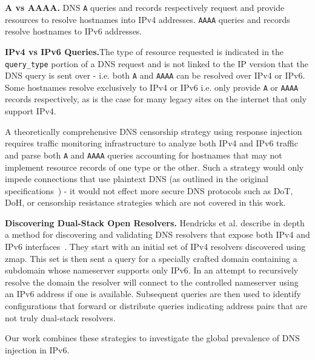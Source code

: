 \textbf{A vs AAAA.} DNS \texttt{A} queries and records respectively request and provide
resources to resolve hostnames into IPv4 addresses. \texttt{AAAA} queries and
records resolve hostnames to IPv6 addresses.

\textbf{IPv4 vs IPv6 Queries.}The type of resource requested is
indicated in the \texttt{query\_type} portion of a DNS request and is not linked
to the IP version that the DNS query is sent over - i.e. both \texttt{A} and
\texttt{AAAA} can be resolved over IPv4 or IPv6.
Some hostnames resolve exclusively to IPv4 or IPv6 i.e. only provide \texttt{A}
or \texttt{AAAA} records respectively, as is the case for many legacy sites on
the internet that only support IPv4.

A theoretically comprehensive DNS censorship strategy using response injection
requires traffic monitoring infrastructure to analyze both IPv4 and IPv6
traffic and parse both \texttt{A} and \texttt{AAAA} queries accounting for hostnames
that may not implement resource records of one type or the other. Such a strategy
would only impede connections that use plaintext DNS (as outlined in the
original specifications~\cite{RFC1035,RFC3596}) - it would not effect more secure DNS
protocols such as DoT, DoH, or censorship resistance strategies which are not
covered in this work.

\textbf{Discovering Dual-Stack Open Resolvers.}
Hendricks et al. describe in depth a method for discovering and validating DNS
resolvers that expose both IPv4 and IPv6 interfaces~\cite{hendriks2017potential}.
They start with an initial
set of IPv4 resolvers discovered using zmap. This set is then sent a query for a
specially crafted domain containing a subdomain whose nameserver supports only
IPv6. In an attempt to recursively resolve the domain the resolver will connect
to the controlled nameserver using an IPv6 address if one is available.
Subsequent queries are then used to identify configurations that forward or
distribute queries indicating address pairs that are not truly dual-stack resolvers.

Our work combines these strategies to investigate the global prevalence of DNS
injection in IPv6.
